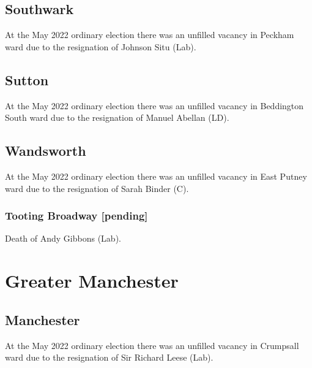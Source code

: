 \documentclass[a4paper,openany]{book}
\begin{document}
\begin{resultsiii}
\subsection*{Southwark}

At the May 2022 ordinary election there was an unfilled vacancy in Peckham ward due to the resignation of Johnson Situ (Lab).%

\subsection*{Sutton}

At the May 2022 ordinary election there was an unfilled vacancy in Beddington South ward due to the resignation of Manuel Abellan (LD).%

\subsection*{Wandsworth}

At the May 2022 ordinary election there was an unfilled vacancy in East Putney ward due to the resignation of Sarah Binder (C).%

\subsubsection*{Tooting Broadway \hspace*{\fill}\nolinebreak[1]%
	\enspace\hspace*{\fill}
	[pending]}


Death of Andy Gibbons (Lab).

\section{Greater Manchester}

\subsection*{Manchester}

At the May 2022 ordinary election there was an unfilled vacancy in Crumpsall ward due to the resignation of Sir Richard Leese (Lab).%


\end{resultsiii}
\end{document}

